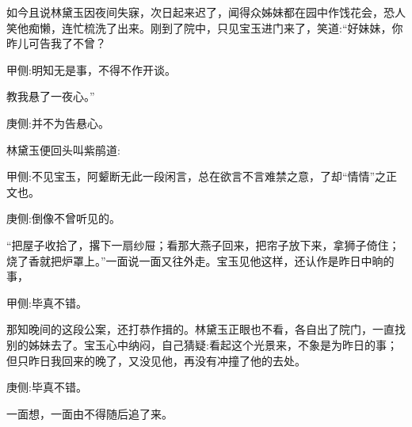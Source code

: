 \begin{parag}
    如今且说林黛玉因夜间失寐，次日起来迟了，闻得众姊妹都在园中作饯花会，恐人笑他痴懒，连忙梳洗了出来。刚到了院中，只见宝玉进门来了，笑道:“好妹妹，你昨儿可告我了不曾？\begin{note}甲侧:明知无是事，不得不作开谈。\end{note}教我悬了一夜心。”\begin{note}庚侧:并不为告悬心。\end{note}林黛玉便回头叫紫鹃道:\begin{note}甲侧:不见宝玉，阿颦断无此一段闲言，总在欲言不言难禁之意，了却“情情”之正文也。\end{note}\begin{note}庚侧:倒像不曾听见的。\end{note}“把屋子收拾了，撂下一扇纱屉；看那大燕子回来，把帘子放下来，拿狮子倚住；烧了香就把炉罩上。”一面说一面又往外走。宝玉见他这样，还认作是昨日中晌的事，\begin{note}甲侧:毕真不错。\end{note}那知晚间的这段公案，还打恭作揖的。林黛玉正眼也不看，各自出了院门，一直找别的姊妹去了。宝玉心中纳闷，自己猜疑:看起这个光景来，不象是为昨日的事；但只昨日我回来的晚了，又没见他，再没有冲撞了他的去处。\begin{note}庚侧:毕真不错。\end{note}一面想，一面由不得随后追了来。
\end{parag}


